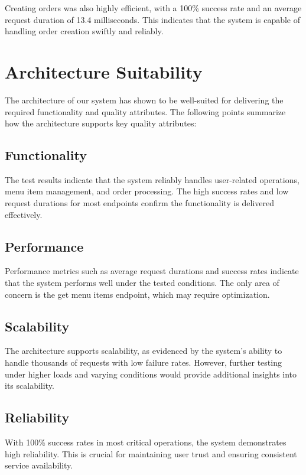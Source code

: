 \documentclass{article}
\begin{document}
Creating orders was also highly efficient, with a 100\% success rate and an average request duration of 13.4 milliseconds. This indicates that the system is capable of handling order creation swiftly and reliably.

\section{Architecture Suitability}

The architecture of our system has shown to be well-suited for delivering the required functionality and quality attributes. The following points summarize how the architecture supports key quality attributes:

\subsection{Functionality}

The test results indicate that the system reliably handles user-related operations, menu item management, and order processing. The high success rates and low request durations for most endpoints confirm the functionality is delivered effectively.

\subsection{Performance}

Performance metrics such as average request durations and success rates indicate that the system performs well under the tested conditions. The only area of concern is the get menu items endpoint, which may require optimization.

\subsection{Scalability}

The architecture supports scalability, as evidenced by the system's ability to handle thousands of requests with low failure rates. However, further testing under higher loads and varying conditions would provide additional insights into its scalability.

\subsection{Reliability}

With 100\% success rates in most critical operations, the system demonstrates high reliability. This is crucial for maintaining user trust and ensuring consistent service availability.
\end{document}
